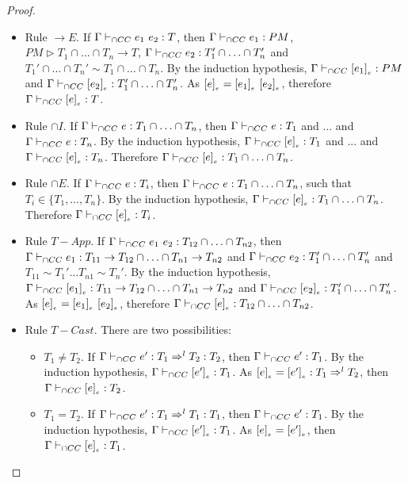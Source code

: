 \documentclass[a4paper]{article}
\begin{document}
\begin{proof}
\begin{itemize}
    \item Rule ${\rightarrow} E$.
    If $\Gamma \vdash_{\cap CC} e_1\ e_2 : T$, then $\Gamma \vdash_{\cap CC} e_1 : PM$, $PM \rhd T_1 \cap \ldots \cap T_n \rightarrow T$, $\Gamma \vdash_{\cap CC} e_2 : T_1' \cap \ldots \cap T_n'$ and $T_1' \cap \ldots \cap T_n' \sim T_1 \cap \ldots \cap T_n$.
    By the induction hypothesis, $\Gamma \vdash_{\cap CC} [e_1]_{_e} : PM$ and $\Gamma \vdash_{\cap CC} [e_2]_{_e} : T_1' \cap \ldots \cap T_n'$.
    As $[e]_{_e} = [e_1]_{_e}\ [e_2]_{_e}$, therefore $\Gamma \vdash_{\cap CC} [e]_{_e} : T$.
    \item Rule ${\cap} I$.
    If $\Gamma \vdash_{\cap CC} e : T_1 \cap \ldots \cap T_n$, then $\Gamma \vdash_{\cap CC} e : T_1$ and ... and $\Gamma \vdash_{\cap CC} e : T_n$.
    By the induction hypothesis, $\Gamma \vdash_{\cap CC} [e]_{_e} : T_1$ and ... and $\Gamma \vdash_{\cap CC} [e]_{_e} : T_n$.
    Therefore $\Gamma \vdash_{\cap CC} [e]_{_e} : T_1 \cap \ldots \cap T_n$.
    \item Rule ${\cap} E$.
    If $\Gamma \vdash_{\cap CC} e : T_i$, then $\Gamma \vdash_{\cap CC} e : T_1 \cap \ldots \cap T_n$, such that $T_i \in \{T_1, \ldots, T_n\}$.
    By the induction hypothesis, $\Gamma \vdash_{\cap CC} [e]_{_e} : T_1 \cap \ldots \cap T_n$.
    Therefore $\Gamma \vdash_{\cap CC} [e]_{_e} : T_i$.
    \item Rule $T{-}App$.
    If $\Gamma \vdash_{\cap CC} e_1\ e_2 : T_{12} \cap \ldots \cap T_{n2}$, then $\Gamma \vdash_{\cap CC} e_1 : T_{11} \rightarrow T_{12} \cap \ldots \cap T_{n1} \rightarrow T_{n2}$ and $\Gamma \vdash_{\cap CC} e_2 : T_1' \cap \ldots \cap T_n'$ and $T_{11} \sim T_1' \ldots T_{n1} \sim T_n'$.
    By the induction hypothesis, $\Gamma \vdash_{\cap CC} [e_1]_{_e} : T_{11} \rightarrow T_{12} \cap \ldots \cap T_{n1} \rightarrow T_{n2}$ and $\Gamma \vdash_{\cap CC} [e_2]_{_e} : T_1' \cap \ldots \cap T_n'$.
    As $[e]_{_e} = [e_1]_{_e}\ [e_2]_{_e}$, therefore $\Gamma \vdash_{\cap CC} [e]_{_e} : T_{12} \cap \ldots \cap T_{n2}$.
    \item Rule $T{-}Cast$.
    There are two possibilities:
    \begin{itemize}
        \item $T_1 \neq T_2$.
        If $\Gamma \vdash_{\cap CC} e' : T_1 \Rightarrow^l T_2 : T_2$, then $\Gamma \vdash_{\cap CC} e' : T_1$.
        By the induction hypothesis, $\Gamma \vdash_{\cap CC} [e']_{_e} : T_1$.
        As $[e]_{_e} = [e']_{_e} : T_1 \Rightarrow^l T_2$, then $\Gamma \vdash_{\cap CC} [e]_{_e} : T_2$.
        \item $T_1 = T_2$.
        If $\Gamma \vdash_{\cap CC} e' : T_1 \Rightarrow^l T_1 : T_1$, then $\Gamma \vdash_{\cap CC} e' : T_1$.
        By the induction hypothesis, $\Gamma \vdash_{\cap CC} [e']_{_e} : T_1$.
        As $[e]_{_e} = [e']_{_e}$, then $\Gamma \vdash_{\cap CC} [e]_{_e} : T_1$.

\end{itemize}
\end{itemize}
\end{proof}
\end{document}
